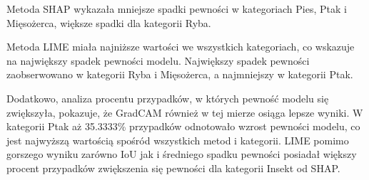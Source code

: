Metoda SHAP wykazała mniejsze spadki pewności w kategoriach Pies, Ptak i Mięsożerca, większe spadki dla kategorii Ryba.

Metoda LIME miała najniższe wartości we wszystkich kategoriach, co wskazuje na największy spadek pewności modelu. Największy spadek pewności zaobserwowano w kategorii Ryba i Mięsożerca, a najmniejszy w kategorii Ptak.

Dodatkowo, analiza procentu przypadków, w których pewność modelu się zwiększyła, pokazuje, że GradCAM również w tej mierze osiąga lepsze wyniki.
W kategorii Ptak aż 35.3333\% przypadków odnotowało wzrost pewności modelu, co jest najwyższą wartością spośród wszystkich metod i kategorii.
LIME pomimo gorszego wyniku zarówno IoU jak i średniego spadku pewności posiadał większy procent przypadków zwiększenia się pewności dla kategorii Insekt od SHAP.

